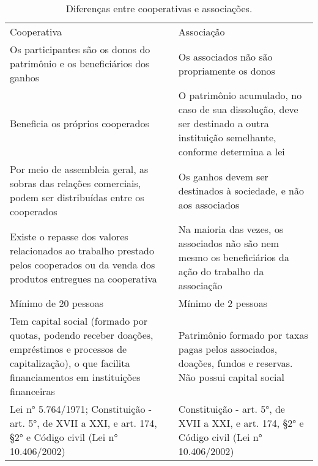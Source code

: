 \begin{table}[htbp]
  \centering
  \caption{Diferenças entre cooperativas e associações.}
    \begin{tabular}{P{17.955em}|P{17.955em}}
     Cooperativa & Associação \\
     Os participantes são os donos do patrimônio e os beneficiários dos ganhos & Os associados não são propriamente os donos \\
     Beneficia os próprios cooperados & O patrimônio acumulado, no caso de sua dissolução, deve ser destinado a outra instituição semelhante, conforme determina a lei \\
     Por meio de assembleia geral, as sobras das relações comerciais, podem ser distribuídas entre os cooperados & Os ganhos devem ser destinados à sociedade, e não aos associados \\
     Existe o repasse dos valores relacionados ao trabalho prestado pelos cooperados ou da venda dos produtos entregues na cooperativa & Na maioria das vezes, os associados não são nem mesmo os beneficiários da ação do trabalho da associação \\
     Mínimo de 20 pessoas & Mínimo de 2 pessoas \\
     Tem capital social (formado por quotas, podendo receber doações, empréstimos e processos de capitalização), o que facilita financiamentos em instituições financeiras  & Patrimônio formado por taxas pagas pelos associados, doações,  fundos e reservas. Não possui capital social \\
     Lei n° 5.764/1971; Constituição - art. 5°, de XVII a XXI, e art. 174, §2° e Código civil (Lei n° 10.406/2002)  & Constituição - art. 5°, de XVII a XXI, e art. 174, §2° e Código civil (Lei n° 10.406/2002)  \\
    \end{tabular}%
  \label{tab:cooper_associa}%
\end{table}%

